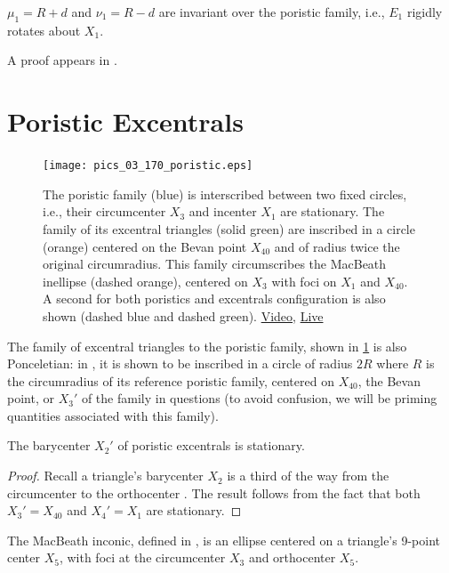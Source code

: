 \begin{proposition}
$\mu_1=R+d$ and $\nu_1=R-d$ are invariant over the poristic family, i.e., $E_1$ rigidly rotates about $X_1$. \label{prop:03-e1}
\end{proposition}

A proof appears in \cite[Appendix C]{garcia2020-similarity-I}.
\section{Poristic Excentrals}

\begin{figure}
    \centering
    \texttt{[image: pics\_03\_170\_poristic.eps]}
    \caption{The poristic family (blue) is interscribed between two fixed circles, i.e., their circumcenter $X_3$ and incenter $X_1$ are stationary. The family of its excentral triangles (solid green) are inscribed in a circle (orange) centered on the Bevan point $X_{40}$ and of radius twice the original circumradius. This family circumscribes the MacBeath inellipse (dashed orange), centered on $X_3$ with foci on $X_1$ and $X_{40}$. A second for both poristics and excentrals configuration is also shown (dashed blue and dashed green).  \href{https://youtu.be/DS4ryndDK6Q}{Video}, \href{https://bit.ly/2RoYJHm}{Live}}
    \label{fig:03-poristic-excentrals}
\end{figure}

The family of excentral triangles to the poristic family, shown in \cref{fig:03-poristic-excentrals} is also Ponceletian: in \cite{odehnal2011-poristic}, it is shown to be inscribed in a circle of radius $2R$ where $R$ is the circumradius of its reference poristic family, centered on $X_{40}$, the Bevan point, or $X_3'$ of the family in questions (to avoid confusion, we will be priming quantities associated with this family).

\begin{proposition}
The barycenter $X_2'$ of poristic excentrals is stationary.
\end{proposition}

\begin{proof}
Recall a triangle's barycenter $X_2$ is a third of the way from the circumcenter to the orthocenter \cite[Euler Line, Eqn. 6]{mw}. The result follows from the fact that both $X_3'=X_{40}$ and $X_4'=X_1$ are stationary.
\end{proof}

The MacBeath inconic, defined in \cite[MacBeath Inconic]{mw}, is an ellipse centered on a triangle's 9-point center $X_5$, with  foci at the circumcenter $X_3$ and orthocenter $X_5$.

